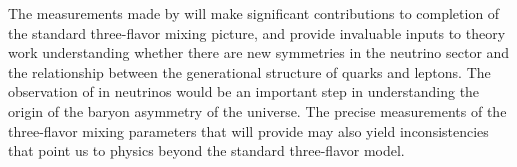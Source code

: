 The measurements made by  will make significant contributions to completion of the standard three-flavor mixing picture, and provide invaluable inputs to theory work understanding whether there are new symmetries in the neutrino sector and the relationship between the generational structure of quarks and leptons. The observation of  in neutrinos would be an important step in understanding the origin of the baryon asymmetry of the universe. The precise measurements of the three-flavor mixing parameters that  will provide may also yield inconsistencies that point us to physics beyond the standard three-flavor model.
